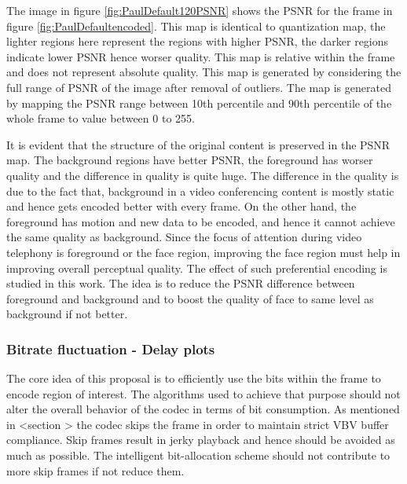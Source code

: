 \documentclass[11pt]{article} %
\begin{document}
The image in figure \ref{fig:PaulDefault120PSNR} shows the PSNR for the frame in figure \ref{fig:PaulDefaultencoded}. This map is identical to quantization map, the lighter regions here represent the regions with higher PSNR, the darker regions indicate lower PSNR hence worser quality. This map is relative within the frame and does not represent  absolute quality. This map is generated by considering the full range of PSNR of the image after removal of outliers. The map is generated by mapping the PSNR range between 10th percentile and 90th percentile of the whole frame to value between 0 to 255. 

It is evident that the structure of the original content is preserved in the PSNR map. The background regions have better PSNR, the foreground has worser quality and the difference in quality is quite huge. The difference in the quality is due to the fact that, background in a video conferencing content is mostly static and hence gets encoded better with every frame. On the other hand, the foreground has motion and new data to be encoded, and hence it cannot achieve the same quality as background. Since the focus of attention during video telephony is foreground or the face region, improving the face region must help in improving overall perceptual quality. The effect of such preferential encoding is studied in this work. The idea is to reduce the PSNR difference between foreground and background and to boost the quality of face to same level as background if not better.
\subsubsection{Bitrate fluctuation - Delay plots}
The core idea of this proposal is to efficiently use the bits within the frame to encode region of interest. The algorithms used to achieve that purpose should not alter the overall behavior of the codec in terms of bit consumption. As mentioned in <section > the codec skips the frame in order to maintain strict VBV buffer compliance. Skip frames result in jerky playback and hence should be avoided as much as possible. The intelligent bit-allocation scheme should not contribute to more skip frames if not reduce them.
\end{document}
